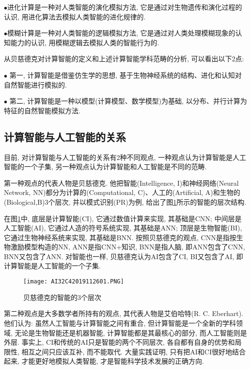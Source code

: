 $\bullet$进化计算是一种对人类智能的演化模拟方法, 它是通过对生物遗传和演化过程的认识, 用进化算法去模拟人类智能的进化规律的.

$\bullet$模糊计算是一种对人类智能的逻辑模拟方法, 它是通过对人类处理模糊现象的认知能力的认识, 用模糊逻辑去模拟人类的智能行为的.

\begin{remark}
从贝慈德克对计算智能的定义和上述计算智能学科范畴的分析, 可以看出以下2点:

$\bullet$ 第一, 计算智能是借鉴仿生学的思想, 基于生物神经系统的结构、进化和认知对自然智能进行模拟的.

$\bullet$ 第二, 计算智能是一种以模型(计算模型、数学模型)为基础, 以分布、并行计算为特征的自然智能模拟方法.
\end{remark}
\subsection{计算智能与人工智能的关系}
目前, 对计算智能与人工智能的关系有2种不同观点, 一种观点认为计算智能是人工智能的一个子集, 另一种观点认为计算智能和人工智能是不同的范畴.

第一种观点的代表人物是贝慈德克. 他把智能(Intelligence, I)和神经网络(Neural Network, NN)都分为计算的(Computational, C)、人工的(Artificial, A)和生物的(Biological,B)3个层次, 并以模式识别(PR)为例, 给出了图\ref{AI32fig26000001}所示的智能的层次结构.

在图\ref{AI32fig26000001}中, 底层是计算智能(CI), 它通过数值计算来实现, 其基础是CNN; 中间层是人工智能(AI), 它通过人造的符号系统实现, 其基础是ANN; 顶层是生物智能(BI), 它通过生物神经系统来实现, 其基础是BNN.
按照贝慈德克的观点, CNN是指按生物激励模型构造的NN, ANN是指CNN+知识, BNN是指人脑, 即ANN包含了CNN, BNN又包含了ANN. 对智能也一样, 贝慈德克认为AI包含了CI, BI又包含了AI, 即计算智能是人工智能的一个子集.
\begin{figure}[H]
\centering
\texttt{[image: AI32C42019112601.PNG]}
\caption{贝慈德克的智能的3个层次}
\label{AI32fig26000001}
\end{figure}

第二种观点是大多数学者所持有的观点, 其代表人物是艾伯哈特(R. C. Eberhart). 他们认为: 虽然人工智能与计算智能之间有重合, 但计算智能是一个全新的学科领域, 无论是生物智能还是机器智能, 计算智能都是其最核心的部分, 而人工智能则是外层.
事实上, CI和传统的AI只是智能的两个不同层次, 各自都有自身的优势和局限性, 相互之间只应该互补, 而不能取代.
大量实践证明, 只有把AI和CI很好地结合起来, 才能更好地模拟人类智能, 才是智能科学技术发展的正确方向.
